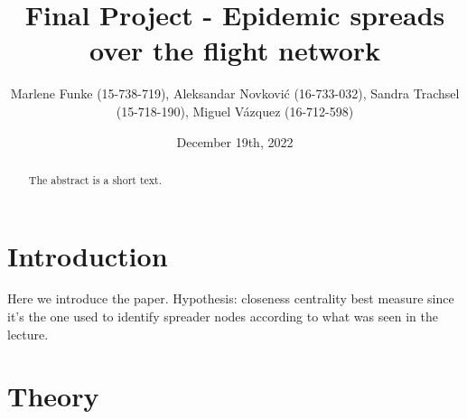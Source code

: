 \documentclass{Resources/netsci-project}
\begin{document}
\title{Final Project - Epidemic spreads over the flight network}
\author{Marlene Funke (15-738-719), Aleksandar Novković (16-733-032), Sandra Trachsel (15-718-190), Miguel Vázquez (16-712-598)}
\date{December 19th, 2022}
\maketitle


\begin{abstract}
The abstract is a short text.
\end{abstract}


\section{Introduction}
Here we introduce the paper. 
Hypothesis: closeness centrality best measure since it's the one used to identify spreader nodes according to what was seen in the lecture.


\section{Theory}
\end{document}
